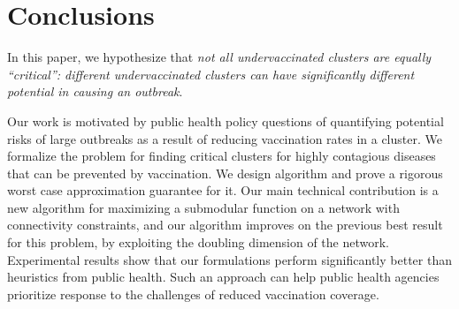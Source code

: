 \section{Conclusions}

In this paper, we hypothesize that \emph{not all undervaccinated clusters are equally ``critical'': different undervaccinated
clusters can have significantly different potential in causing an
outbreak}.

Our work is motivated by public health policy questions of quantifying potential risks of large outbreaks as a result
of reducing vaccination rates in a cluster. We formalize the problem \maxcrit{}
for finding critical clusters for highly contagious diseases that can be prevented by vaccination. 
We design algorithm \algomaxcrit{} and prove a rigorous worst case approximation guarantee for it. Our main technical contribution is a new algorithm for maximizing a submodular function on a network with connectivity constraints, and our algorithm improves on the previous best result for this problem, by exploiting the doubling dimension of the network.
Experimental results show that our formulations perform significantly better than heuristics from public health. Such an approach
can help public health agencies prioritize response to the challenges of reduced vaccination
coverage.


